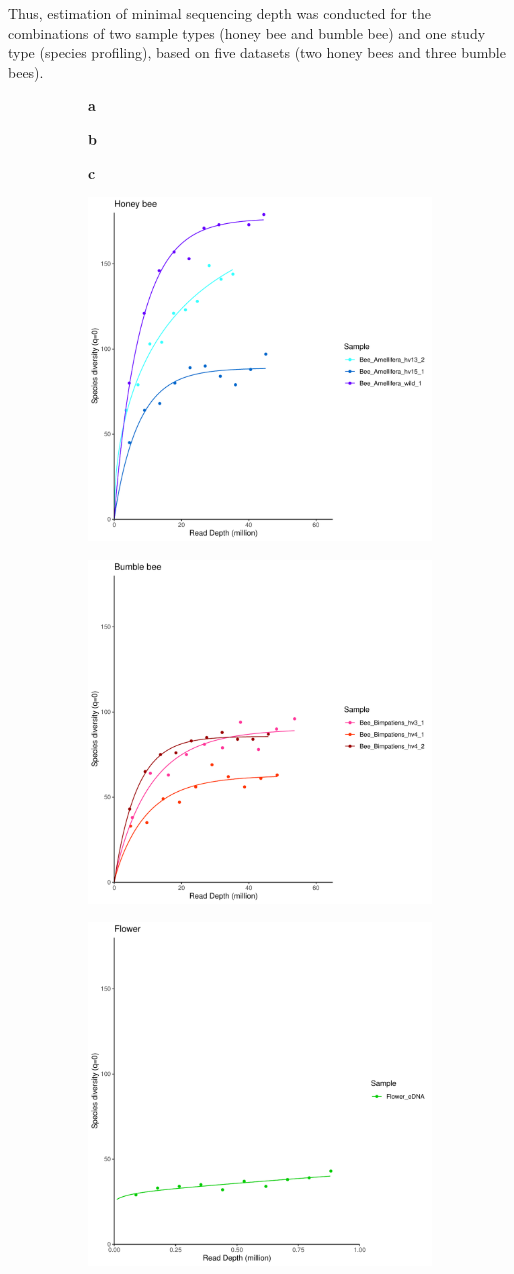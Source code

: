 \documentclass[11pt]{article}
\begin{document}
    Thus, estimation of minimal sequencing depth was conducted for the combinations of two sample types (honey bee and bumble bee) and one study type (species profiling), based on five datasets (two honey bees and three bumble bees).
    \begin{figure}[H]
      \begin{subfigure}
        \centering
        \textbf{a}
      \end{subfigure}
      \hspace{0.32\linewidth}
      \begin{subfigure}
        \centering
        \textbf{b}
      \end{subfigure}
      \hspace{0.32\linewidth}
      \begin{subfigure}
        \centering
        \textbf{c}
      \end{subfigure}
      \newline
      \hfill
      \begin{subfigure}
        \centering
        \includegraphics[width=0.3\linewidth,height=0.3\linewidth]{../Figures/Honey_TaxonHill_0.pdf}
      \end{subfigure}
      \hfill
      \begin{subfigure}
        \centering
        \includegraphics[width=0.3\linewidth,height=0.3\linewidth]{../Figures/Bumble_TaxonHill_0.pdf}
      \end{subfigure}
      \hfill
      \begin{subfigure}
        \centering
        \includegraphics[width=0.3\linewidth,height=0.3\linewidth]{../Figures/Flower_TaxonHill_0.pdf}

\end{subfigure}
\end{figure}
\end{document}
